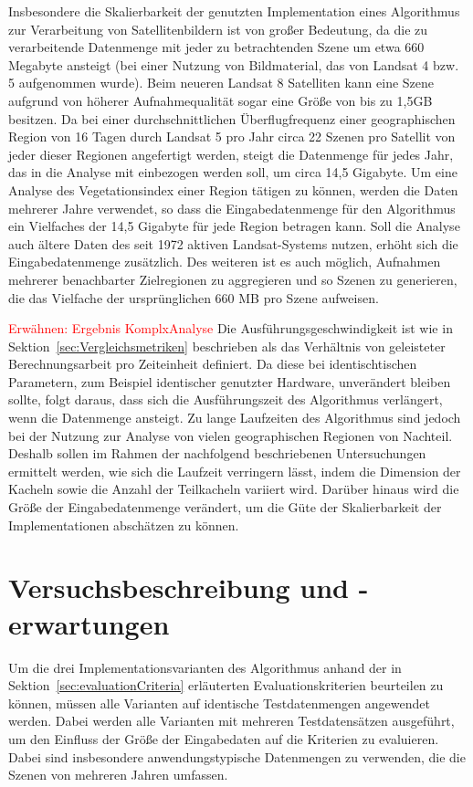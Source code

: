 Insbesondere die Skalierbarkeit der genutzten Implementation eines Algorithmus zur Verarbeitung von Satellitenbildern ist von großer Bedeutung, da die zu verarbeitende Datenmenge mit jeder zu betrachtenden Szene um etwa 660 Megabyte ansteigt (bei einer Nutzung von Bildmaterial, das von Landsat 4 bzw. 5 aufgenommen wurde). Beim neueren Landsat 8 Satelliten kann eine Szene aufgrund von höherer Aufnahmequalität sogar eine Größe von bis zu 1,5GB besitzen. Da bei einer durchschnittlichen Überflugfrequenz einer geographischen Region von 16 Tagen durch Landsat 5 pro Jahr circa 22 Szenen pro Satellit von jeder dieser Regionen angefertigt werden, steigt die Datenmenge für jedes Jahr, das in die Analyse mit einbezogen werden soll, um circa 14,5 Gigabyte. Um eine Analyse des Vegetationsindex einer Region tätigen zu können, werden die Daten mehrerer Jahre verwendet, so dass die Eingabedatenmenge für den Algorithmus ein Vielfaches der 14,5 Gigabyte für jede Region betragen kann. Soll die Analyse auch ältere Daten des seit 1972 aktiven Landsat-Systems nutzen, erhöht sich die Eingabedatenmenge zusätzlich. Des weiteren ist es auch möglich, Aufnahmen mehrerer benachbarter Zielregionen zu aggregieren und so Szenen zu generieren, die das Vielfache der ursprünglichen 660 MB pro Szene aufweisen. 

\textcolor{red}{Erwähnen: Ergebnis KomplxAnalyse}
Die Ausführungsgeschwindigkeit ist wie in Sektion~\ref{sec:Vergleichsmetriken} beschrieben als das Verhältnis von geleisteter Berechnungsarbeit pro Zeiteinheit definiert. Da diese bei identischtischen Parametern, zum Beispiel identischer genutzter Hardware, unverändert bleiben sollte, folgt daraus, dass sich die Ausführungszeit des Algorithmus verlängert, wenn die Datenmenge ansteigt. Zu lange Laufzeiten des Algorithmus sind jedoch bei der Nutzung zur Analyse von vielen geographischen Regionen von Nachteil. Deshalb sollen im Rahmen der nachfolgend beschriebenen Untersuchungen ermittelt werden, wie sich die Laufzeit verringern lässt, indem die Dimension der Kacheln sowie die Anzahl der Teilkacheln variiert wird. Darüber hinaus wird die Größe der Eingabedatenmenge verändert, um die Güte der Skalierbarkeit der Implementationen abschätzen zu können.

\section{Versuchsbeschreibung und -erwartungen}
Um die drei Implementationsvarianten des Algorithmus anhand der in Sektion~\ref{sec:evaluationCriteria} erläuterten Evaluationskriterien beurteilen zu können, müssen alle Varianten auf identische Testdatenmengen angewendet werden. Dabei werden alle Varianten mit mehreren Testdatensätzen ausgeführt, um den Einfluss der Größe der Eingabedaten auf die Kriterien zu evaluieren. Dabei sind insbesondere anwendungstypische Datenmengen zu verwenden, die die Szenen von mehreren Jahren umfassen.

